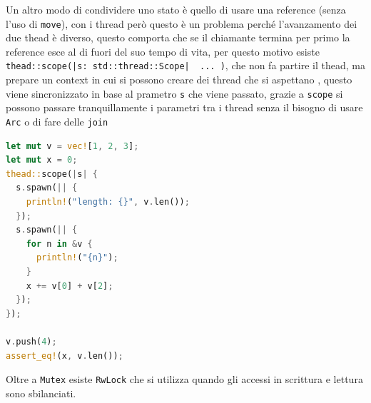 \documentclass[12pt]{article}
\begin{document}
Un altro modo di condividere uno stato \`e quello di usare una reference (senza l'uso di \texttt{move}), con i thread per\`o questo \`e un problema perch\'e l'avanzamento dei due thead \`e diverso, questo comporta che se il chiamante termina per primo la reference esce al di fuori del suo tempo di vita, per questo motivo esiste \texttt{thead::scope(|s: std::thread::Scope| { ... })}, che non fa partire il thead, ma prepare un context in cui si possono creare dei thread che si aspettano , questo viene sincronizzato in base al prametro \texttt{s} che viene passato, grazie a \texttt{scope} si possono passare tranquillamente i parametri tra i thread senza il bisogno di usare \texttt{Arc} o di fare delle \texttt{join}
\begin{lstlisting}[language=rust]
let mut v = vec![1, 2, 3];
let mut x = 0;
thead::scope(|s| {
  s.spawn(|| {
    println!("length: {}", v.len());
  });
  s.spawn(|| {
    for n in &v {
      println!("{n}");
    }
    x += v[0] + v[2];
  });
});

v.push(4);
assert_eq!(x, v.len());
\end{lstlisting}
Oltre a \texttt{Mutex} esiste \texttt{RwLock} che si utilizza quando gli accessi in scrittura e lettura sono sbilanciati.
\end{document}

